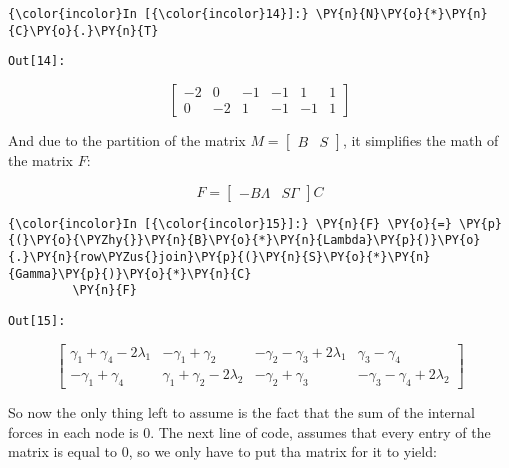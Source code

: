     \begin{Verbatim}[commandchars=\\\{\}]
{\color{incolor}In [{\color{incolor}14}]:} \PY{n}{N}\PY{o}{*}\PY{n}{C}\PY{o}{.}\PY{n}{T}
\end{Verbatim}
\texttt{\color{outcolor}Out[{\color{outcolor}14}]:}


        \begin{equation*}
        \left[\begin{matrix}-2 & 0 & -1 & -1 & 1 & 1\\0 & -2 & 1 & -1 & -1 & 1\end{matrix}\right]
        \end{equation*}



    And due to the partition of the matrix
\(M = \begin{bmatrix} B & S \end{bmatrix}\), it simplifies the math of
the matrix \(F\):

\[
F =
\begin{bmatrix}
-B \Lambda & S \Gamma
\end{bmatrix} C
\]

    \begin{Verbatim}[commandchars=\\\{\}]
{\color{incolor}In [{\color{incolor}15}]:} \PY{n}{F} \PY{o}{=} \PY{p}{(}\PY{o}{\PYZhy{}}\PY{n}{B}\PY{o}{*}\PY{n}{Lambda}\PY{p}{)}\PY{o}{.}\PY{n}{row\PYZus{}join}\PY{p}{(}\PY{n}{S}\PY{o}{*}\PY{n}{Gamma}\PY{p}{)}\PY{o}{*}\PY{n}{C}
         \PY{n}{F}
\end{Verbatim}
\texttt{\color{outcolor}Out[{\color{outcolor}15}]:}


        \begin{equation*}
        \left[\begin{matrix}\gamma_{1} + \gamma_{4} - 2 \lambda_{1} & - \gamma_{1} + \gamma_{2} & - \gamma_{2} - \gamma_{3} + 2 \lambda_{1} & \gamma_{3} - \gamma_{4}\\- \gamma_{1} + \gamma_{4} & \gamma_{1} + \gamma_{2} - 2 \lambda_{2} & - \gamma_{2} + \gamma_{3} & - \gamma_{3} - \gamma_{4} + 2 \lambda_{2}\end{matrix}\right]
        \end{equation*}



    So now the only thing left to assume is the fact that the sum of the
internal forces in each node is \(0\). The next line of code, assumes
that every entry of the matrix is equal to \(0\), so we only have to put
tha matrix for it to yield:

